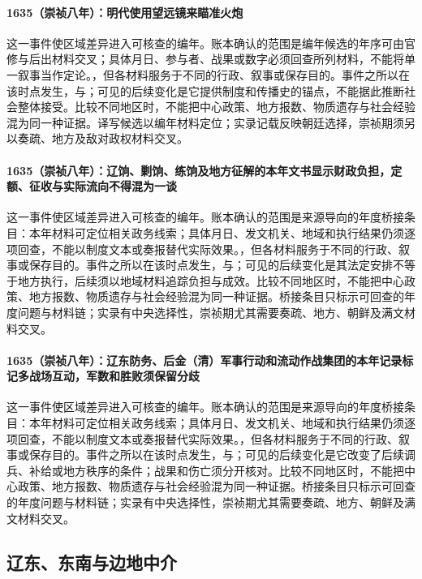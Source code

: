 \paragraph{1635（崇祯八年）：明代使用望远镜来瞄准火炮} 这一事件使区域差异进入可核查的编年。账本确认的范围是编年候选的年序可由官修与后出材料交叉；具体月日、参与者、战果或数字必须回查所列材料，不能将单一叙事当作定论。，但各材料服务于不同的行政、叙事或保存目的。事件之所以在该时点发生，与；可见的后续变化是它提供制度和传播史的锚点，不能据此推断社会整体接受。比较不同地区时，不能把中心政策、地方报数、物质遗存与社会经验混为同一种证据。译写候选以编年材料定位；实录记载反映朝廷选择，崇祯期须另以奏疏、地方及敌对政权材料交叉。

\paragraph{1635（崇祯八年）：辽饷、剿饷、练饷及地方征解的本年文书显示财政负担，定额、征收与实际流向不得混为一谈} 这一事件使区域差异进入可核查的编年。账本确认的范围是来源导向的年度桥接条目：本年材料可定位相关政务线索；具体月日、发文机关、地域和执行结果仍须逐项回查，不能以制度文本或奏报替代实际效果。，但各材料服务于不同的行政、叙事或保存目的。事件之所以在该时点发生，与；可见的后续变化是其法定安排不等于地方执行，后续须以地域材料追踪负担与成效。比较不同地区时，不能把中心政策、地方报数、物质遗存与社会经验混为同一种证据。桥接条目只标示可回查的年度问题与材料链；实录有中央选择性，崇祯期尤其需要奏疏、地方、朝鲜及满文材料交叉。

\paragraph{1635（崇祯八年）：辽东防务、后金（清）军事行动和流动作战集团的本年记录标记多战场互动，军数和胜败须保留分歧} 这一事件使区域差异进入可核查的编年。账本确认的范围是来源导向的年度桥接条目：本年材料可定位相关政务线索；具体月日、发文机关、地域和执行结果仍须逐项回查，不能以制度文本或奏报替代实际效果。，但各材料服务于不同的行政、叙事或保存目的。事件之所以在该时点发生，与；可见的后续变化是它改变了后续调兵、补给或地方秩序的条件；战果和伤亡须分开核对。比较不同地区时，不能把中心政策、地方报数、物质遗存与社会经验混为同一种证据。桥接条目只标示可回查的年度问题与材料链；实录有中央选择性，崇祯期尤其需要奏疏、地方、朝鲜及满文材料交叉。

\subsection{辽东、东南与边地中介}

